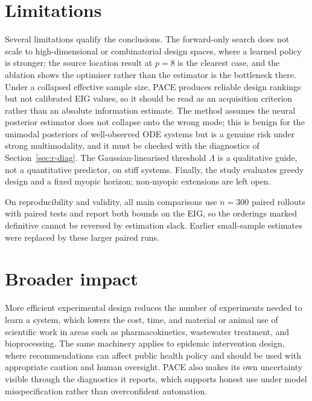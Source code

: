 \section{Limitations}
\label{sec:d-limits}

Several limitations qualify the conclusions. The forward-only search does not scale
to high-dimensional or combinatorial design spaces, where a learned policy is
stronger; the source location result at $p{=}8$ is the clearest case, and the
ablation shows the optimiser rather than the estimator is the bottleneck there.
Under a collapsed effective sample size, PACE produces reliable design rankings but
not calibrated EIG values, so it should be read as an acquisition criterion rather
than an absolute information estimate. The method assumes the neural posterior
estimator does not collapse onto the wrong mode; this is benign for the unimodal
posteriors of well-observed ODE systems but is a genuine risk under strong
multimodality, and it must be checked with the diagnostics of
Section~\ref{sec:r-diag}. The Gaussian-linearised threshold $\Lambda$ is a
qualitative guide, not a quantitative predictor, on stiff systems. Finally, the
study evaluates greedy design and a fixed myopic horizon; non-myopic extensions are
left open.

On reproducibility and validity, all main comparisons use $n=300$ paired rollouts
with paired tests and report both bounds on the EIG, so the orderings marked
definitive cannot be reversed by estimation slack. Earlier small-sample estimates
were replaced by these larger paired runs.

\section{Broader impact}
\label{sec:d-impact}

More efficient experimental design reduces the number of experiments needed to
learn a system, which lowers the cost, time, and material or animal use of
scientific work in areas such as pharmacokinetics, wastewater treatment, and
bioprocessing. The same machinery applies to epidemic intervention design, where
recommendations can affect public health policy and should be used with appropriate
caution and human oversight. PACE also makes its own uncertainty visible through the
diagnostics it reports, which supports honest use under model misspecification
rather than overconfident automation.
